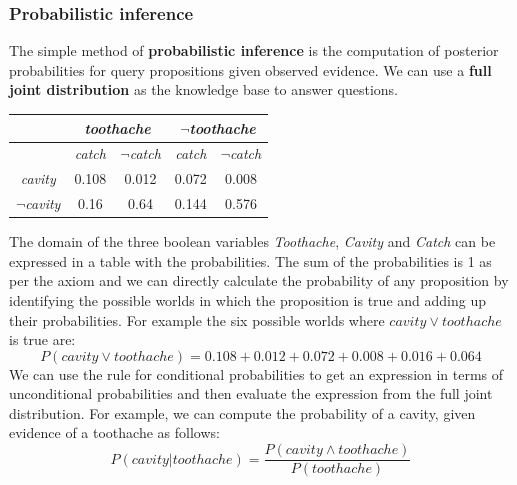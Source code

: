 \documentclass{article}
\begin{document}
\subsubsection{Probabilistic inference}
The simple method of \textbf{probabilistic inference} is the computation of posterior probabilities for query propositions given observed evidence. We can use a \textbf{full joint distribution} as the knowledge base to answer questions.
\begin{center}
\begin{tabular}{|c|c|c|c|c|}
\hline
& \multicolumn{2}{c|}{\textit{toothache}} & \multicolumn{2}{c|}{$\neg$\textit{toothache}} \\
\hline
& \textit{catch} & $\neg$\textit{catch} & \textit{catch} & $\neg$\textit{catch} \\
\hline
\textit{cavity} & 0.108 & 0.012 & 0.072 & 0.008 \\
\hline
$\neg$\textit{cavity} & 0.16 & 0.64 & 0.144 & 0.576 \\
\hline
\end{tabular}
\end{center}
The domain of the three boolean variables \textit{Toothache}, \textit{Cavity} and \textit{Catch} can be expressed in a table with the probabilities. The sum of the probabilities is 1 as per the axiom and we can directly calculate the probability of any proposition by identifying the possible worlds in which the proposition is true and adding up their probabilities. For example the six possible worlds where $cavity \vee toothache$ is true are:
\begin{equation}
P(cavity \vee toothache) = 0.108 + 0.012 + 0.072 + 0.008 + 0.016 + 0.064
\end{equation}
We can use the rule for conditional probabilities to get an expression in terms of unconditional probabilities and then evaluate the expression from the full joint distribution. For example, we can compute the probability of a cavity, given evidence of a toothache as follows:
\begin{equation}
P(cavity | toothache) = \frac{P(cavity \wedge toothache)}{P(toothache)}
\end{equation}
\end{document}

